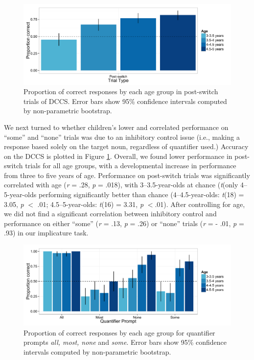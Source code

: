 \documentclass[man]{apa2}
\begin{document}
\begin{figure} 
 \begin{center} 
  \includegraphics[scale=.5]{figures/DCCS.pdf} 
  \caption{\label{fig:exp3_DCCS} Proportion of correct responses by each age group in post-switch trials of DCCS. Error bars show 95\% confidence intervals computed by non-parametric bootstrap.} 
 \end{center} 
\end{figure}

We next turned to whether children's lower and correlated performance on ``some'' and ``none'' trials was due to an inhibitory control issue (i.e., making a response based solely on the target noun, regardless of quantifier used.) Accuracy on the DCCS is plotted in Figure \ref{fig:exp3_DCCS}. Overall, we found lower performance in post-switch trials for all age groups, with a developmental increase in performance from three to five years of age. Performance on post-switch trials was significantly correlated with age (\textit{r} = .28, \textit{p} = .018), with 3--3.5-year-olds at chance (\emph{t}(only 4--5-year-olds performing significantly better than chance (4--4.5-year-olds: \emph{t}(18) = 3.05, \emph{p} $<$ .01; 4.5--5-year-olds: \emph{t}(16) = 3.31, \emph{p} $< $.01). After controlling for age, we did not find a significant correlation between inhibitory control and performance on either ``some'' (\textit{r} = .13, \textit{p} = .26) or ``none'' trials (\textit{r} = - .01, \textit{p} = .93) in our implicature task.

\begin{figure} 
 \begin{center} 
  \includegraphics[scale=.5]{figures/exp3_GQright.pdf} 
  \caption{\label{fig:exp3_GQright} Proportion of correct responses by each age group for quantifier prompts \textit{all, most, none} and \textit{some}. Error bars show 95\% confidence intervals computed by non-parametric bootstrap.} 
 \end{center} 
\end{figure}
\end{document}
